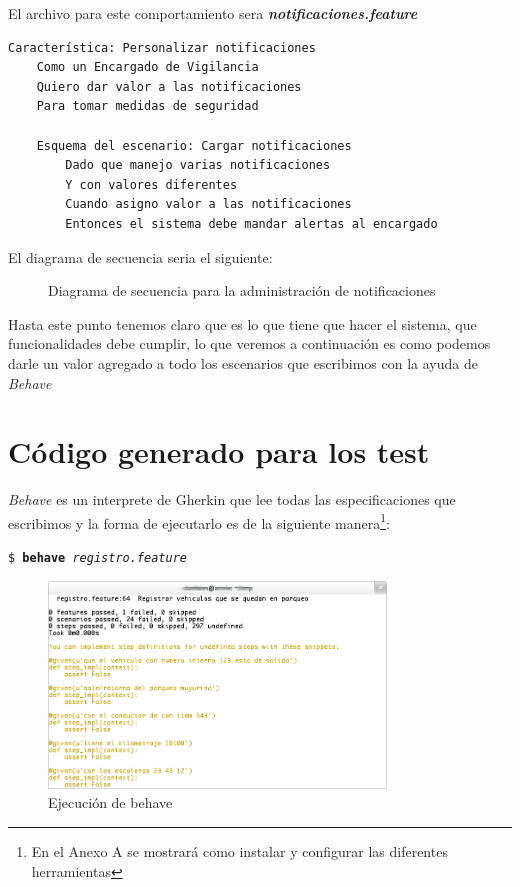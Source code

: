El archivo para este comportamiento sera {\it \bfseries notificaciones.feature}

{\scriptsize
\begin{verbatim}
Característica: Personalizar notificaciones
    Como un Encargado de Vigilancia
    Quiero dar valor a las notificaciones
    Para tomar medidas de seguridad

    Esquema del escenario: Cargar notificaciones
        Dado que manejo varias notificaciones
        Y con valores diferentes
        Cuando asigno valor a las notificaciones
        Entonces el sistema debe mandar alertas al encargado
\end{verbatim}
}

El diagrama de secuencia seria el siguiente:

\begin{figure}[h]
  \begin{center}
    \def\svgwidth{\columnwidth}
    
    \caption[Diagrama de secuencia - Administrar notificaciones]{
    Diagrama de secuencia para la administración de notificaciones}
  \end{center}
\end{figure}

Hasta este punto tenemos claro que es lo que tiene que hacer el sistema, que funcionalidades
debe cumplir, lo que veremos a continuación es como podemos darle un valor agregado
a todo los escenarios que escribimos con la ayuda de {\it Behave}

\section{Código generado para los test}
{\it Behave} es un interprete de Gherkin que lee todas las especificaciones que
escribimos y la forma de ejecutarlo es de la siguiente manera\footnote{En el Anexo A
se mostrará como instalar y configurar las diferentes herramientas}:

\vspace{0.5cm}
\texttt{\$ {\bfseries behave} \emph{registro.feature}}
\vspace{0.5cm}

\begin{figure}[h]
  \begin{center}
  \includegraphics[width=0.8\textwidth]{figures/chapter4/behave01m.png}
  \caption[Behave - primera ejecución]{Ejecución de behave}
\end{center}
\end{figure}

